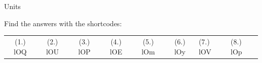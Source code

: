 \begin{eocexercises}{Units}
  \label{m30853**end}
\par {} Find the answers with the shortcodes:
 \par \begin{tabular}[h]{cccccc}
 (1.) lOQ  &  (2.) lOU  &  (3.) lOP  &  (4.) lOE  &  (5.) lOm  &  (6.) lOy  &  (7.) lOV  &  (8.) lOp  & \end{tabular}
\end{eocexercises}
